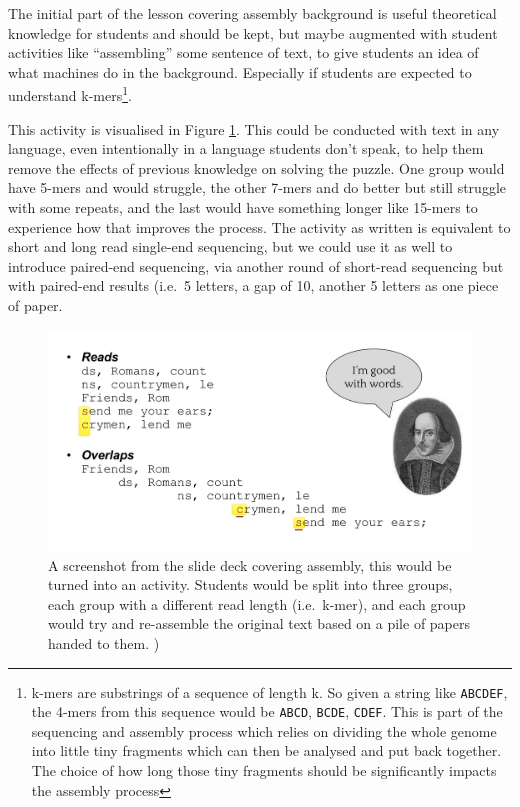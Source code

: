 \documentclass[paper=a4,justified,a4paper]{tufte-handout}
\begin{document}
The initial part of the lesson covering assembly background is useful
theoretical knowledge for students and should be kept, but maybe
augmented with student activities like ``assembling'' some sentence of
text, to give students an idea of what machines do in the background.
Especially if students are expected to understand k-mers\footnote{k-mers
  are substrings of a sequence of length k. So given a string like
  \texttt{ABCDEF}, the 4-mers from this sequence would be \texttt{ABCD},
  \texttt{BCDE}, \texttt{CDEF}. This is part of the sequencing and
  assembly process which relies on dividing the whole genome into little
  tiny fragments which can then be analysed and put back together. The
  choice of how long those tiny fragments should be significantly
  impacts the assembly process}.

This activity is visualised in Figure \ref{fig:activity}. This could be
conducted with text in any language, even intentionally in a language
students don't speak, to help them remove the effects of previous
knowledge on solving the puzzle. One group would have 5-mers and would
struggle, the other 7-mers and do better but still struggle with some
repeats, and the last would have something longer like 15-mers to
experience how that improves the process. The activity as written is
equivalent to short and long read single-end sequencing, but we could
use it as well to introduce paired-end sequencing, via another round of
short-read sequencing but with paired-end results (i.e.~5 letters, a gap
of 10, another 5 letters as one piece of paper.

\begin{figure}
\centering
\includegraphics{./activity.png}
\caption{A screenshot from the slide deck covering assembly, this would
be turned into an activity. Students would be split into three groups,
each group with a different read length (i.e.~k-mer), and each group
would try and re-assemble the original text based on a pile of papers
handed to them. )\label{fig:activity}}
\end{figure}
\end{document}

